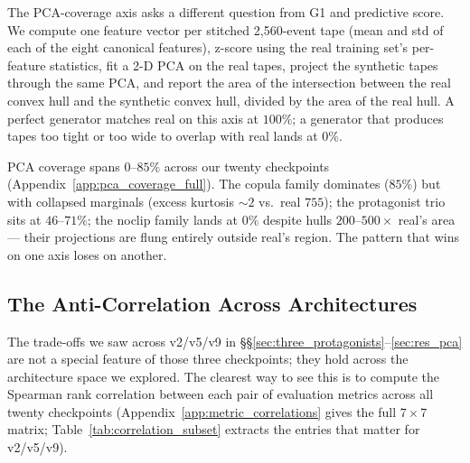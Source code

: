 \documentclass[journal]{IEEEtran}
\theoremstyle{definition}   %
\begin{document}
The PCA-coverage axis asks a different question from G1 and predictive
score. We compute one feature vector per stitched 2,560-event tape (mean
and std of each of the eight canonical features), z-score using the real
training set's per-feature statistics, fit a 2-D PCA on the real tapes,
project the synthetic tapes through the same PCA, and report the area
of the intersection between the real convex hull and the synthetic
convex hull, divided by the area of the real hull. A perfect generator
matches real on this axis at $100\%$; a generator that produces tapes
too tight or too wide to overlap with real lands at $0\%$.

PCA coverage spans $0$--$85\%$ across our twenty checkpoints
(Appendix~\ref{app:pca_coverage_full}). The copula family
dominates ($85\%$) but with collapsed marginals (excess kurtosis
$\sim 2$ vs.\ real $755$); the protagonist trio sits at
$46$--$71\%$; the noclip family lands at $0\%$ despite hulls
$200$--$500\times$ real's area --- their projections are flung
entirely outside real's region. The pattern that wins on one axis
loses on another.

\subsection{The Anti-Correlation Across Architectures}
\label{sec:res_anticorrelation}

The trade-offs we saw across v2/v5/v9 in
\S\S\ref{sec:three_protagonists}--\ref{sec:res_pca} are not a special
feature of those three checkpoints; they hold across the architecture
space we explored. The clearest way to see this is to compute the
Spearman rank correlation between each pair of evaluation metrics
across all twenty checkpoints (Appendix~\ref{app:metric_correlations}
gives the full $7 \times 7$ matrix; Table~\ref{tab:correlation_subset}
extracts the entries that matter for v2/v5/v9).
\end{document}
